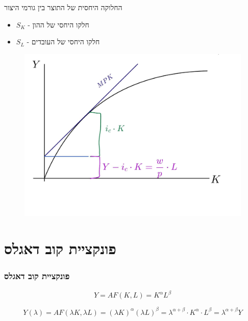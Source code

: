 \documentclass[usenames,dvipsnames]{beamer}
\renewcommand{\a}{\alpha}
\begin{document}
\begin{RTL}
\begin{frame}[allowframebreaks]
\begin{block}{החלוקה היחסית של התוצר בין גורמי היצור}
            \begin{itemize}
                \item $S_K$ - חלקו היחסי של ההון
                \item $S_L$ - חלקו היחסי של העובדים
            \end{itemize}
        \end{block}


        \framebreak
        \begin{figure}
            \begin{small}
                \begin{center}
                    \includegraphics[width=1.1\textwidth]{WhatsApp Image 2024-02-10 at 23.50.58.jpeg}
                \end{center}
                \caption{}
                \label{fig:}
            \end{small}
        \end{figure}
        
    \end{frame}

    \section{פונקציית קוב דאגלס}
    \begin{frame}[allowframebreaks]
        \frametitle{פונקציית קוב דאגלס}
        \begin{equation*}
            Y = AF(K,L) = K^{\a} L^{\beta}
        \end{equation*}

        \begin{equation*}
            Y(\lambda) = AF(\lambda K, \lambda L) = (\lambda K ) ^ \alpha (\lambda L) ^ \beta = \lambda ^ {\alpha + \beta} \cdot K ^ \alpha \cdot L ^ \beta = \lambda ^{\alpha + \beta} Y
        \end{equation*}
        

\end{frame}
\end{RTL}
\end{document}

